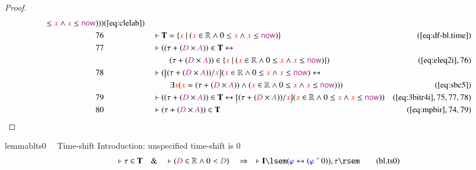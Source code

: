 \begin{proof}
\begin{align}
      \le \msc{x} \wedge \msc{x} \le \mathsf{\mc{now}} ) )
      )&(\mbox{\ref{eq:clelab}})\notag
  \\ 76 &&  & \vdash \mathbf{T} = \{ \msc{x}~\vert~( \msc{x} \in \mathbb{R} \wedge
      0 \le \msc{x} \wedge \msc{x} \le \mathsf{\mc{now}} )
      \}&(\mbox{\ref{eq:df-bl.time}})\notag
  \\ 77 &&  & \vdash ( ( \tau + ( \mc{D} \times \mc{A} ) ) \in \mathbf{T}
      \leftrightarrow \notag \\ & & & \qquad
       ( \tau + ( \mc{D} \times \mc{A} ) )
      \in \{ \msc{x}~\vert~( \msc{x} \in \mathbb{R} \wedge 0
      \le \msc{x} \wedge \msc{x} \le \mathsf{\mc{now}} ) \}
      )&(\mbox{\ref{eq:eleq2i}},76)\notag
  \\ 78 &&  & \vdash ( \underaccent{\dot}{[} ( \tau + ( \mc{D} \times \mc{A} ) )
      / \msc{x} \underaccent{\dot}{]} ( \msc{x} \in
      \mathbb{R} \wedge 0 \le \msc{x} \wedge \msc{x} \le
      \mathsf{\mc{now}} ) \leftrightarrow  \notag \\ & & & \qquad
      \exists \msc{x} (
      \msc{x} = ( \tau + ( \mc{D} \times \mc{A} ) ) \wedge (
      \msc{x} \in \mathbb{R} \wedge 0 \le \msc{x} \wedge
      \msc{x} \le \mathsf{\mc{now}} ) )
      )&(\mbox{\ref{eq:sbc5}})\notag
  \\ 79 &&  & \vdash ( ( \tau + ( \mc{D} \times \mc{A} ) ) \in \mathbf{T}
      \leftrightarrow \underaccent{\dot}{[} ( \tau + (
      \mc{D} \times \mc{A} ) ) / \msc{x}
      \underaccent{\dot}{]} ( \msc{x} \in \mathbb{R} \wedge
      0 \le \msc{x} \wedge \msc{x} \le \mathsf{\mc{now}} )
      )&(\mbox{\ref{eq:3bitr4i}},75,77,78)\notag
  \\ 80 &&  & \vdash ( \tau + ( \mc{D} \times \mc{A} ) ) \in
      \mathbf{T}&(\mbox{\ref{eq:mpbir}},74,79)\notag
\end{align}
\end{proof}

\begin{restatable}{lemma}{blts0}~~ Time-shift Introduction: unspecified
time-shift is 0
\begin{align}
\vdash \tau \in \mathbf{T}\quad\&\quad \vdash ( \mc{D} \in \mathbb{R} \wedge 0
    < \mc{D} )\quad\Rightarrow\quad \vdash \mathbf{I} \lsem ( \mw{\varphi}
    \leftrightarrow ( \mw{\varphi} ~\string^~ 0 ) ) , \tau
    \rsem\label{eq:bl.ts0}\tag{bl.ts0}
\end{align}
\end{restatable}

